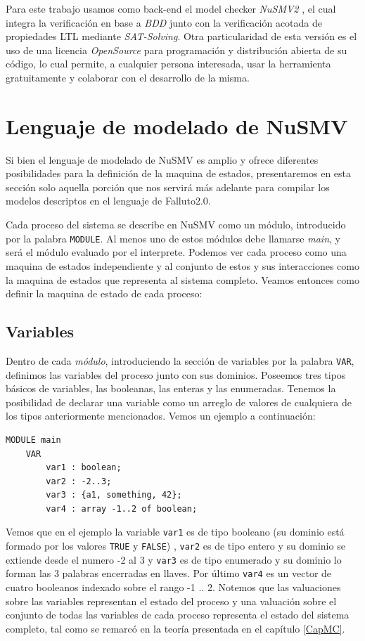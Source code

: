 \documentclass[titlepage, 12pt]{book}
\begin{document}
Para este trabajo usamos como back-end el model checker \textit{NuSMV2} \cite{NuSMV2}, el cual integra la verificaci\'on en base a \textit{BDD} junto con la verificaci\'on acotada de propiedades LTL mediante \textit{SAT-Solving}. Otra particularidad de esta versi\'on es el uso de una licencia \textit{OpenSource} para programaci\'on y distribuci\'on abierta de su c\'odigo, lo cual permite, a cualquier persona interesada, usar la herramienta gratuitamente y colaborar con el desarrollo de la misma.


\section{Lenguaje de modelado de NuSMV}
Si bien el lenguaje de modelado de NuSMV es amplio y ofrece diferentes posibilidades para la definici\'on de la maquina de estados, presentaremos en esta secci\'on solo aquella porci\'on que nos servir\'a m\'as adelante para compilar los modelos descriptos en el lenguaje de Falluto2.0.

Cada proceso del sistema se describe en NuSMV como un m\'odulo, introducido por la palabra \texttt{MODULE}. Al menos uno de estos m\'odulos debe llamarse \textit{main}, y ser\'a el m\'odulo evaluado por el interprete. Podemos ver cada proceso como una maquina de estados independiente y al conjunto de estos y sus interacciones como la maquina de estados que representa al sistema completo. Veamos entonces como definir la maquina de estado de cada proceso:

\subsection*{Variables}

Dentro de cada \textit{m\'odulo}, introduciendo la secci\'on de variables por la palabra \texttt{VAR}, definimos las variables del proceso junto con sus dominios. Poseemos tres tipos b\'asicos de variables, las booleanas, las enteras y las enumeradas. Tenemos la posibilidad de declarar una variable como un arreglo de valores de cualquiera de los tipos anteriormente mencionados. Vemos un ejemplo a continuaci\'on:
\begin{verbatim}
MODULE main
    VAR
        var1 : boolean;
        var2 : -2..3;
        var3 : {a1, something, 42};
        var4 : array -1..2 of boolean;
\end{verbatim}
Vemos que en el ejemplo la variable \texttt{var1} es de tipo booleano (su dominio est\'a formado por los valores \texttt{TRUE} y \texttt{FALSE}) , \texttt{var2} es de tipo entero y su dominio se extiende desde el numero -2 al 3 y \texttt{var3} es de tipo enumerado y su dominio lo forman las 3 palabras encerradas en llaves. Por \'ultimo \texttt{var4} es un vector de cuatro booleanos indexado sobre el rango -1 .. 2. Notemos que las valuaciones sobre las variables representan el estado del proceso y una valuaci\'on sobre el conjunto de todas las variables de cada proceso representa el estado del sistema completo, tal como se remarc\'o en la teor\'ia presentada en el cap\'itulo \ref{CapMC}.
\end{document}
